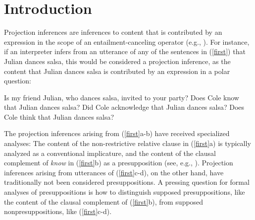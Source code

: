 \documentclass[11pt,fleqn]{article}
\newcommand{\6}{\mbox{$[\hspace*{-.6mm}[$}}
\newcommand{\9}{\mbox{$]\hspace*{-.6mm}]$}}
\newcommand{\citepos}[1]{\citeauthor{#1}'s \citeyear{#1}}
\begin{document}
\begin{abstract}

Presuppositions have long been taken to be a well-defined class of content that is characterized by typically projecting and being conventionally associated with particular lexical items or constructions (e.g., \citealt{heim83,vds92,mandelkern-etal2020,presupposition-sep}). While the strength of the projection inference is often taken to distinguish presuppositions from nonpresuppositions, experimental investigations that used inference tasks suggested that the strength of the projection inference does not distinguish the two (e.g., \citealt{demarneffe-etal-sub23,tbd-variability,degen-tonhauser-language}). \citealt{mandelkern-etal2020} proposed that an alternative measure, namely comparison of naturalness ratings in explicit ignorance and support contexts, distinguishes presuppositions from nonpresuppositions. This paper presents the results of an experiment designed to investigate \citepos{mandelkern-etal2020} proposal for the contents of the complements of factive and nonfactive clause-embedding predicates. The results do not support \citepos{mandelkern-etal2020} proposal, which means that the question of how presuppositional projection inferences can be distinguished from nonpresuppositional ones is still open.

\end{abstract}
		
\section{Introduction}\label{s1}

Projection inferences are inferences to content that is contributed by an expression in the scope of an entailment-canceling operator (e.g., \citealt{potts05,brst-lang11,tbd-variability,degen-tonhauser-language}). For instance, if an interpreter infers from an utterance of any of the sentences in (\ref{first}) that Julian dances salsa, this would be considered a projection inference, as the content that Julian dances salsa is contributed by an expression in a polar question:
\begin{exe}
\ex\label{first} 
\begin{xlist}
\ex Is my friend Julian, who dances salsa, invited to your party?
\ex Does Cole know that Julian dances salsa?
\ex Did Cole acknowledge that Julian dances salsa?
\ex Does Cole think that Julian dances salsa?
\end{xlist}
\end{exe}
The projection inferences arising from (\ref{first}a-b) have received specialized analyses: The content of the non-restrictive relative clause in (\ref{first}a) is typically analyzed as a conventional implicature, and the content of the clausal complement of \emph{know} in (\ref{first}b) as a presupposition (see, e.g., \citealt{ccmg90,potts05,brst-lang11}).  Projection inferences arising from utterances of (\ref{first}c-d), on the other hand, have traditionally not been considered presuppositions. A pressing question for formal analyses of presuppositions is how to distinguish supposed presuppositions, like the content of the clausal complement of (\ref{first}b), from supposed nonpresuppositions, like (\ref{first}c-d). 
\end{document}
